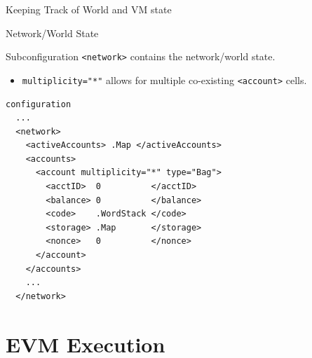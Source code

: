 \documentclass[8pt,ignorenonframetext,]{beamer}
\providecommand{\tightlist}{%
  \setlength{\itemsep}{0pt}\setlength{\parskip}{0pt}}
\begin{document}
\begin{frame}[fragile]{Keeping Track of World and VM state}

\begin{block}{Network/World State}

Subconfiguration \texttt{\textless{}network\textgreater{}} contains the
network/world state.

\begin{itemize}
\tightlist
\item
  \texttt{multiplicity="*"} allows for multiple co-existing
  \texttt{\textless{}account\textgreater{}} cells.
\end{itemize}

\begin{verbatim}
configuration
  ...
  <network>
    <activeAccounts> .Map </activeAccounts>
    <accounts>
      <account multiplicity="*" type="Bag">
        <acctID>  0          </acctID>
        <balance> 0          </balance>
        <code>    .WordStack </code>
        <storage> .Map       </storage>
        <nonce>   0          </nonce>
      </account>
    </accounts>
    ...
  </network>
\end{verbatim}

\end{block}

\end{frame}

\section{EVM Execution}\label{evm-execution}
\end{document}
